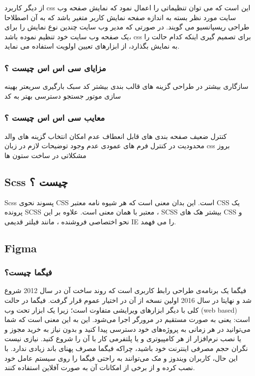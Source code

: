 از دیگر کاربرد css این است که می توان تنظیماتی را اعمال نمود که نمایش صفحه وب سایت مورد نظر بسته به اندازه صفحه نمایش کاربر متغیر باشد که به آن اصطلاحا طراحی ریسپانسیو می گویند. در صورتی که مدیر وب سایت چندین نوع نمایش را برای یک صفحه وب سایت خود تنظیم نموده باشد،  css برای تصمیم گیری اینکه کدام حالت را به نمایش بگذارد، از ابزارهای تعیین اولویت استفاده می نماید.

\subsubsection{مزایای سی اس اس چیست ؟}
سازگاری بیشتر در طراحی
گزینه های قالب بندی بیشتر
کد سبک
بارگیری سریعتر
بهینه سازی موتور جستجو
دسترسی بهتر به کد

\subsubsection{معایب سی اس اس چیست ؟}
کنترل ضعیف صفحه بندی های قابل انعطاف
عدم امکان انتخاب گزینه های والد
محدودیت در کنترل فرم های عمودی
عدم وجود توضیحات لازم در زبان css 
بروز مشکلاتی در ساخت ستون ها

\subsection{Scss چیست ؟}
Scss پسوند نحوی CSS است. این بدان معنی است که هر شیوه نامه معتبر CSS یک پرونده SCSS معتبر با همان معنی است. علاوه بر این ، SCSS بیشتر هک های CSS و نحو اختصاصی فروشنده ، مانند فیلتر قدیمی IE را می فهمد.


\subsection{Figma}
\subsubsection{فیگما چیست؟}
فیگما یک برنامه‌ی طراحی رابط کاربری است که روند ساخت آن در سال 2012 شروع شد و نهایتا در سال 2016 اولین نسخه از آن در اختیار عموم قرار گرفت. فیگما در حالت کلی با دیگر ابزارهای ویرایشی متفاوت است؛ زیرا یک ابزار تحت وب (web based) است: یعنی به صورت مستقیم در مرورگر اجرا می‌شود. این به این معنی است که شما می‌توانید در هر زمانی به پروژه‌های خود دسترسی پیدا کنید و بدون نیاز به خرید مجوز و یا نصب نرم‌افزار از هر کامپیوتری و یا پلتفرمی کار با آن را شروع کنید. نیازی نیست نگران حجم مصرفی اینترنت خود باشید، چراکه فیگما مصرف پهنای باند زیادی ندارد. با این حال، کاربران ویندوز و مک می‌توانند به راحتی فیگما را روی سیستم عامل خود نصب کرده و از برخی از امکانات آن‌ به صورت آفلاین استفاده کنند.

